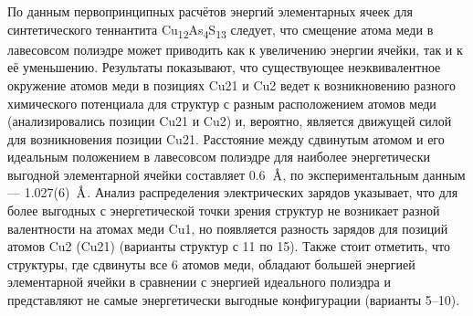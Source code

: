 По данным первопринципных расчётов энергий элементарных ячеек для синтетического теннантита Cu\textsubscript{12}As\textsubscript{4}S\textsubscript{13} следует,  что смещение атома меди в лавесовсом полиэдре может приводить как к увеличению энергии ячейки, так и к её уменьшению.
Результаты показывают, что существующее неэквивалентное  окружение атомов меди в позициях Cu21 и Cu2 ведет к возникновению разного химического потенциала для структур с разным расположением атомов меди (анализировались позиции Cu21 и Cu2) и, вероятно, является движущей силой для возникновения позиции Cu21. Расстояние между сдвинутым атомом и его идеальным положением в лавесовсом полиэдре для наиболее энергетически выгодной элементарной ячейки составляет 0.6~$\mbox{\normalfont\AA}$, по экспериментальным данным --- 1.027(6)~$\mbox{\normalfont\AA}$.
Анализ распределения электрических зарядов указывает, что для более выгодных с энергетической точки зрения структур не возникает разной валентности на атомах меди Cu1,
но появляется разность зарядов для позиций атомов Cu2 (Cu21) (варианты структур с 11 по 15). Также стоит отметить, что структуры, где сдвинуты все 6 атомов меди, обладают большей энергией элементарной ячейки в сравнении с энергией идеального полиэдра и представляют не самые энергетически выгодные конфигурации  (варианты 5--10).










\clearpage

\newpage
